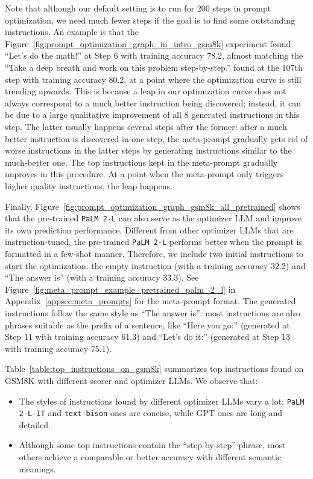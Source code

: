 Note that although our default setting is to run \name{} for 200 steps in prompt optimization, we need much fewer steps if the goal is to find some outstanding instructions.
An example is that the Figure~\ref{fig:prompt_optimization_graph_in_intro_gsm8k} experiment found ``Let's do the math!'' at Step 6 with training accuracy 78.2, almost matching the ``Take a deep breath and work on this problem step-by-step.'' found at the 107th step with training accuracy 80.2, at a point where the optimization curve is still trending upwards.
This is because a leap in our optimization curve does not always correspond to a much better instruction being discovered; instead, it can be due to a large qualitative improvement of all 8 generated instructions in this step.
The latter usually happens several steps after the former: after a much better instruction is discovered in one step, the meta-prompt gradually gets rid of worse instructions in the latter steps by generating instructions similar to the much-better one. 
The top instructions kept in the meta-prompt gradually improves in this procedure.
At a point when the meta-prompt only triggers higher quality instructions, the leap happens.

Finally, Figure~\ref{fig:prompt_optimization_graph_gsm8k_all_pretrained} shows that the pre-trained \texttt{PaLM 2-L} can also serve as the optimizer LLM and improve its own prediction performance.
Different from other optimizer LLMs that are instruction-tuned, the pre-trained \texttt{PaLM 2-L} performs better when the prompt is formatted in a few-shot manner. Therefore, we include two initial instructions to start the optimization: the empty instruction (with a training accuracy 32.2) and ``The answer is'' (with a training accuracy 33.3).
See Figure~\ref{fig:meta_prompt_example_pretrained_palm_2_l} in Appendix~\ref{appsec:meta_prompts} for the meta-prompt format.
The generated instructions follow the same style as ``The answer is'': most instructions are also phrases suitable as the prefix of a sentence, like ``Here you go:'' (generated at Step 11 with training accuracy 61.3) and ``Let's do it:'' (generated at Step 13 with training accuracy 75.1).

Table~\ref{table:top_instructions_on_gsm8k} summarizes top instructions found on GSM8K with different scorer and optimizer LLMs.
We observe that:
\begin{itemize}[leftmargin=2em,topsep=0pt,partopsep=1ex,parsep=0ex]
\item The styles of instructions found by different optimizer LLMs vary a lot: \texttt{PaLM 2-L-IT} and \texttt{text-bison} ones are concise, while GPT ones are long and detailed.
\item Although some top instructions contain the ``step-by-step'' phrase, most others achieve a comparable or better accuracy with different semantic meanings.
\end{itemize}

